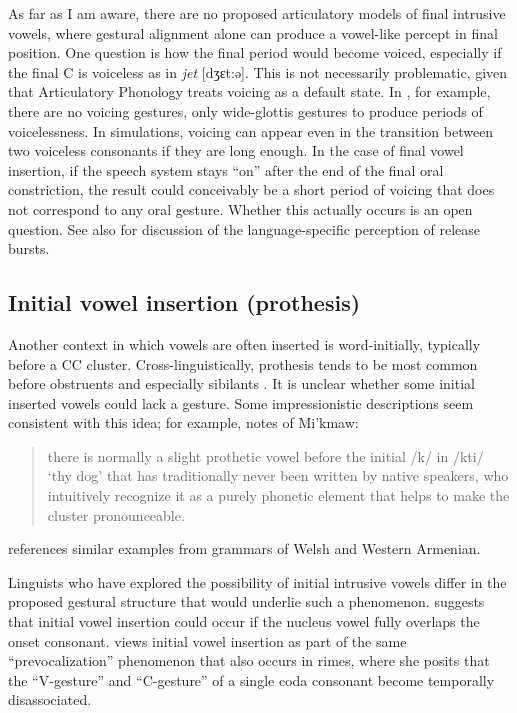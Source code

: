 \documentclass[output=paper,colorlinks,citecolor=brown]{langscibook}
\begin{document}
As far as I am aware, there are no proposed articulatory models of final intrusive vowels, where gestural alignment alone can produce a vowel-like percept in final position. One question is how the final period would become voiced, especially if the final C is voiceless as in \textit{jet} [dʒɛt:ə]. This is not necessarily problematic, given that Articulatory Phonology treats voicing as a default state. In \citet{browman1992targetless}, for example, there are no voicing gestures, only wide-glottis gestures to produce periods of voicelessness. In simulations, voicing can appear even in the transition between two voiceless consonants if they are long enough. In the case of final vowel insertion, if the speech system stays “on” after the end of the final oral constriction, the result could conceivably be a short period of voicing that does not correspond to any oral gesture. Whether this actually occurs is an open question. See also  for discussion of the language-specific perception of release bursts. 

\subsection{Initial vowel insertion (prothesis)}

Another context in which vowels are often inserted is word-initially, typically before a CC cluster. Cross-linguistically, prothesis tends to be most common before obstruents and especially sibilants \citep{fleischhacker2005similarity}. It is unclear whether some initial inserted vowels could lack a gesture. Some impressionistic descriptions seem consistent with this idea; for example, \citet[138]{hewson1986syllables} notes of Mi'k\-maw:

\begin{quote}
    there is normally a slight prothetic vowel before the initial /k/ in /kti/ ‘thy dog’ that has traditionally never been written by native speakers, who intuitively recognize it as a purely phonetic element that helps to make the cluster pronounceable.
\end{quote}


\citet{operstein2010consonant} references similar examples from grammars of Welsh and Western Armenian.

Linguists who have explored the possibility of initial intrusive vowels differ in the proposed gestural structure that would underlie such a phenomenon. \citet[260]{Bellik2019a} suggests that initial vowel insertion could occur if the nucleus vowel fully overlaps the onset consonant. \citet[154--155]{operstein2010consonant} views initial vowel insertion as part of the same “prevocalization” phenomenon that also occurs in rimes, where she posits that the “V-gesture” and “C-gesture” of a single coda consonant become temporally disassociated. 
\end{document}
